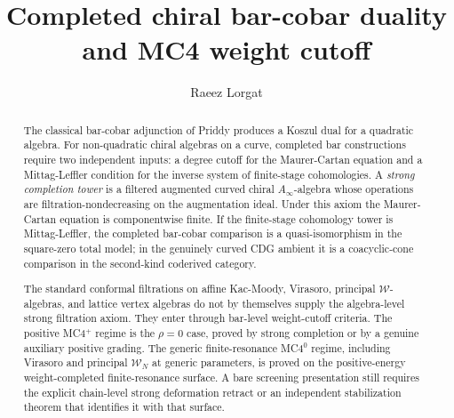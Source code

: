 \documentclass[11pt,reqno]{amsart}
\theoremstyle{definition}
\theoremstyle{remark}
\newcommand{\cW}{\mathcal{W}}
\newcommand{\Ainf}{A_\infty}
\numberwithin{equation}{section}
\begin{document}
\title[Completed chiral bar-cobar duality and MC4 weight cutoff]%
{Completed chiral bar-cobar duality and MC4 weight cutoff}

\author{Raeez Lorgat}
\address{Department of Mathematics, Harvard University,
 Cambridge, MA 02138, USA}

\date{}

\begin{abstract}
The classical bar-cobar adjunction of Priddy produces a Koszul
dual for a quadratic algebra. For non-quadratic chiral algebras
on a curve, completed bar constructions require two independent
inputs: a degree cutoff for the Maurer-Cartan equation and a
Mittag-Leffler condition for the inverse system of finite-stage
cohomologies. A \emph{strong completion tower} is a filtered
augmented curved chiral $\Ainf$-algebra whose operations are
filtration-nondecreasing on the augmentation ideal. Under this
axiom the Maurer-Cartan equation is componentwise finite. If the
finite-stage cohomology tower is Mittag-Leffler, the completed
bar-cobar comparison is a quasi-isomorphism in the square-zero
total model; in the genuinely curved CDG ambient it is a
coacyclic-cone comparison in the second-kind coderived category.

The standard conformal filtrations on affine Kac-Moody, Virasoro,
principal $\cW$-algebras, and lattice vertex algebras do not by
themselves supply the algebra-level strong filtration axiom.
They enter through bar-level weight-cutoff criteria. The
positive MC4${}^+$ regime is the $\rho=0$ case, proved by strong
completion or by a genuine auxiliary positive grading. The generic
finite-resonance MC4${}^0$ regime, including Virasoro and
principal $\cW_N$ at generic parameters, is proved on the
positive-energy weight-completed finite-resonance surface. A bare
screening presentation still requires the explicit chain-level
strong deformation retract or an independent stabilization theorem
that identifies it with that surface.
\end{abstract}



\maketitle
\end{document}
